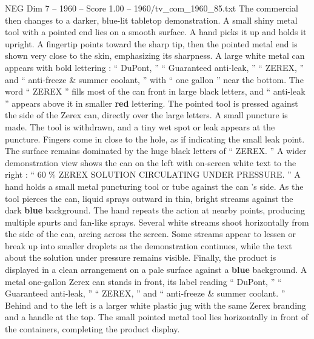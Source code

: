 \begin{textsample}{NEG Dim 7 – 1960 – Score 1.00 – 1960/tv\_com\_1960\_85.txt}
The commercial then changes to a darker, blue-lit tabletop demonstration.
A small shiny metal tool with a pointed end lies on a smooth surface.
A hand picks it up and holds it upright.
A fingertip points toward the sharp tip, then the pointed metal end is shown very close to the skin, emphasizing its sharpness.
A large white metal can appears with bold lettering : “ DuPont, ” “ Guaranteed anti-leak, ” “ ZEREX, ” and “ anti-freeze \& summer coolant, ” with “ one gallon ” near the bottom.
The word “ ZEREX ” fills most of the can front in large black letters, and “ anti-leak ” appears above it in smaller \textbf{red} lettering.
The pointed tool is pressed against the side of the Zerex can, directly over the large letters.
A small puncture is made.
The tool is withdrawn, and a tiny wet spot or leak appears at the puncture.
Fingers come in close to the hole, as if indicating the small leak point.
The surface remains dominated by the huge black letters of “ ZEREX. ” A wider demonstration view shows the can on the left with on-screen white text to the right : “ 60 \% ZEREX SOLUTION CIRCULATING UNDER PRESSURE. ” A hand holds a small metal puncturing tool or tube against the can ’s side.
As the tool pierces the can, liquid sprays outward in thin, bright streams against the dark \textbf{blue} background.
The hand repeats the action at nearby points, producing multiple spurts and fan-like sprays.
Several white streams shoot horizontally from the side of the can, arcing across the screen.
Some streams appear to lessen or break up into smaller droplets as the demonstration continues, while the text about the solution under pressure remains visible.
Finally, the product is displayed in a clean arrangement on a pale surface against a \textbf{blue} background.
A metal one-gallon Zerex can stands in front, its label reading “ DuPont, ” “ Guaranteed anti-leak, ” “ ZEREX, ” and “ anti-freeze \& summer coolant. ” Behind and to the left is a larger white plastic jug with the same Zerex branding and a handle at the top.
The small pointed metal tool lies horizontally in front of the containers, completing the product display.

\end{textsample}
